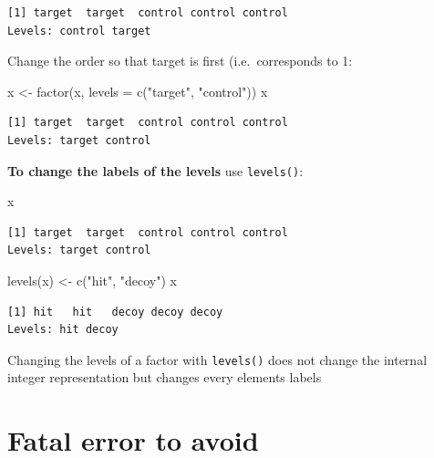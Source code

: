 \documentclass[
]{book}
\makeatletter
\newenvironment{Shaded}{\begin{snugshade}}{\end{snugshade}}
\newcommand{\AttributeTok}[1]{\textcolor[rgb]{0.77,0.63,0.00}{#1}}
\newcommand{\FunctionTok}[1]{\textcolor[rgb]{0.00,0.00,0.00}{#1}}
\newcommand{\NormalTok}[1]{#1}
\newcommand{\OtherTok}[1]{\textcolor[rgb]{0.56,0.35,0.01}{#1}}
\newcommand{\StringTok}[1]{\textcolor[rgb]{0.31,0.60,0.02}{#1}}
\newenvironment{kframe}{%
\medskip{}
\setlength{\fboxsep}{.8em}
 \def\at@end@of@kframe{}%
 \ifinner\ifhmode%
  \def\at@end@of@kframe{\end{minipage}}%
  \begin{minipage}{\columnwidth}%
 \fi\fi%
 \def\FrameCommand##1{\hskip\@totalleftmargin \hskip-\fboxsep
 \colorbox{shadecolor}{##1}\hskip-\fboxsep
     \hskip-\linewidth \hskip-\@totalleftmargin \hskip\columnwidth}%
 \MakeFramed {\advance\hsize-\width
   \@totalleftmargin\z@ \linewidth\hsize
   \@setminipage}}%
 {\par\unskip\endMakeFramed%
 \at@end@of@kframe}
\newenvironment{rmdblock}[1]
  {
  \begin{itemize}
  \renewcommand{\labelitemi}{
    \raisebox{-.7\height}[0pt][0pt]{
      {\setkeys{Gin}{width=3em,keepaspectratio}\texttt{[image: images/\#1]}}
    }
  }
  \setlength{\fboxsep}{1em}
  \begin{kframe}
  \item
  }
  {
  \end{kframe}
  \end{itemize}
  }
\newenvironment{warning}
  {\begin{rmdblock}{warning}}
  {\end{rmdblock}}
\makeatother
\begin{document}
\begin{verbatim}
[1] target  target  control control control
Levels: control target
\end{verbatim}

Change the order so that target is first (i.e.~corresponds to 1:

\begin{Shaded}
\begin{Highlighting}[]
\NormalTok{x }\OtherTok{\textless{}{-}} \FunctionTok{factor}\NormalTok{(x, }\AttributeTok{levels =} \FunctionTok{c}\NormalTok{(}\StringTok{"target"}\NormalTok{, }\StringTok{"control"}\NormalTok{))}
\NormalTok{x}
\end{Highlighting}
\end{Shaded}

\begin{verbatim}
[1] target  target  control control control
Levels: target control
\end{verbatim}

\textbf{To change the labels of the levels} use \texttt{levels()}:

\begin{Shaded}
\begin{Highlighting}[]
\NormalTok{x}
\end{Highlighting}
\end{Shaded}

\begin{verbatim}
[1] target  target  control control control
Levels: target control
\end{verbatim}

\begin{Shaded}
\begin{Highlighting}[]
\FunctionTok{levels}\NormalTok{(x) }\OtherTok{\textless{}{-}} \FunctionTok{c}\NormalTok{(}\StringTok{"hit"}\NormalTok{, }\StringTok{"decoy"}\NormalTok{)}
\NormalTok{x}
\end{Highlighting}
\end{Shaded}

\begin{verbatim}
[1] hit   hit   decoy decoy decoy
Levels: hit decoy
\end{verbatim}

\begin{warning}
Changing the levels of a factor with \texttt{levels()} does not change
the internal integer representation but changes every elements labels
\end{warning}

\hypertarget{fatal-error-to-avoid}{%
\section{Fatal error to avoid}\label{fatal-error-to-avoid}}
\end{document}
